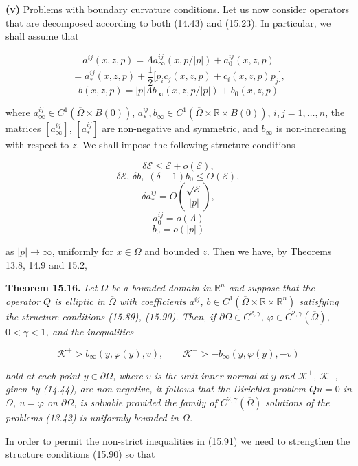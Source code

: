 \medskip

\textbf{(v)} Problems with boundary curvature conditions. Let us now consider operators that are decomposed according to both (14.43) and (15.23). In particular, we shall assume that

\[
a^{ij}(x,z,p)=\Lambda a_\infty^{ij}(x,p/|p|)+a_0^{ij}(x,z,p)
\]
\[
\tag{15.89}
= a_*^{ij}(x,z,p)+\frac12\bigl[p_ic_j(x,z,p)+c_i(x,z,p)p_j\bigr],
\]
\[
b(x,z,p)=|p|\Lambda b_\infty(x,z,p/|p|)+b_0(x,z,p)
\]

\noindent where $a_\infty^{ij}\in C^1(\overline{\Omega}\times B(0))$, $a_*^{ij}, b_\infty\in C^1(\overline{\Omega}\times\mathbb{R}\times B(0))$, $i,j=1,\ldots,n$, the matrices $[a_\infty^{ij}]$, $[a_*^{ij}]$ are non-negative and symmetric, and $b_\infty$ is non-increasing with respect to $z$. We shall impose the following structure conditions

\[
\delta\mathcal{E}\le \mathcal{E}+o(\mathcal{E}),
\]
\[
\delta\mathcal{E},\,\delta b,\;(\delta-1)b_0\le O(\mathcal{E}),
\]
\[
\tag{15.90}
\delta a_*^{ij}=O\!\left(\frac{\sqrt{\mathcal{E}}}{|p|}\right),
\]
\[
a_0^{ij}=o(\Lambda)
\]
\[
b_0=o(|p|)
\]



as $|p|\to\infty$, uniformly for $x\in\Omega$ and bounded $z$. Then we have, by Theorems 13.8,
14.9 and 15.2,

\medskip

\textbf{Theorem 15.16.} \emph{Let $\Omega$ be a bounded domain in $\mathbb{R}^n$ and suppose that the operator $Q$
is elliptic in $\overline{\Omega}$ with coefficients $a^{ij}$, $b\in C^1(\overline{\Omega}\times\mathbb{R}\times\mathbb{R}^n)$ satisfying the structure
conditions (15.89), (15.90). Then, if $\partial\Omega\in C^{2,\gamma}$, $\varphi\in C^{2,\gamma}(\overline{\Omega})$, $0<\gamma<1$, and the
inequalities}

\[
\tag{15.91}
\mathcal{K}^{+}>b_\infty(y,\varphi(y),v), \qquad \mathcal{K}^{-}>-b_\infty(y,\varphi(y),-v)
\]

\emph{hold at each point $y\in\partial\Omega$, where $v$ is the unit inner normal at $y$ and $\mathcal{K}^{+}$, $\mathcal{K}^{-}$, given by
(14.44), are non-negative, it follows that the Dirichlet problem $Qu=0$ in $\Omega$, $u=\varphi$
on $\partial\Omega$, is solvable provided the family of $C^{2,\gamma}(\overline{\Omega})$ solutions of the problems (13.42) is
uniformly bounded in $\Omega$.}

\medskip

In order to permit the non-strict inequalities in (15.91) we need to strengthen
the structure conditions (15.90) so that

